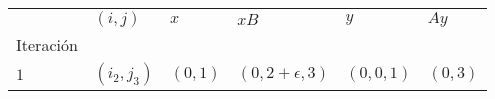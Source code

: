 \begin{tabular}{llllll}
\toprule
{} &       $(i, j)$ &              $x$ &                    $xB$ &                     $y$ &             $Ay$ \\
Iteración &                &                  &                         &                         &                  \\
\midrule
$1$         &  $(i_2, j_3)$ &  $(0, 1)$ &  $(0, 2 + \epsilon, 3)$ &  $(0, 0, 1)$ &  $(0 , 3)$ \\
\bottomrule
\end{tabular}
